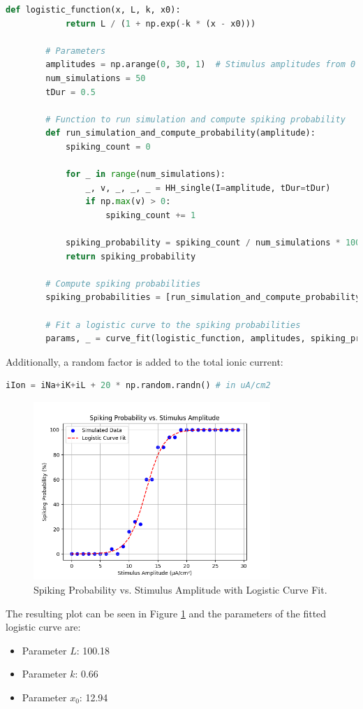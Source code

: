 \documentclass{article}
\begin{document}
    \begin{lstlisting}[language=Python, style=mystyle]
        def logistic_function(x, L, k, x0):
            return L / (1 + np.exp(-k * (x - x0)))

        # Parameters
        amplitudes = np.arange(0, 30, 1)  # Stimulus amplitudes from 0 to 30 μA/cm² in 1 μA/cm² steps
        num_simulations = 50
        tDur = 0.5

        # Function to run simulation and compute spiking probability
        def run_simulation_and_compute_probability(amplitude):
            spiking_count = 0

            for _ in range(num_simulations):
                _, v, _, _, _ = HH_single(I=amplitude, tDur=tDur)
                if np.max(v) > 0:
                    spiking_count += 1

            spiking_probability = spiking_count / num_simulations * 100
            return spiking_probability

        # Compute spiking probabilities
        spiking_probabilities = [run_simulation_and_compute_probability(amplitude) for amplitude in amplitudes]

        # Fit a logistic curve to the spiking probabilities
        params, _ = curve_fit(logistic_function, amplitudes, spiking_probabilities, p0=[100, 1, 15])
    \end{lstlisting}

    Additionally, a random factor is added to the total ionic current:
    \begin{lstlisting}[language=Python, style=mystyle]
        iIon = iNa+iK+iL + 20 * np.random.randn() # in uA/cm2
    \end{lstlisting}

    \begin{figure}[h]
        \centering
        \includegraphics[width=0.8\textwidth]{spiking_probability.png}
        \caption{Spiking Probability vs. Stimulus Amplitude with Logistic Curve Fit.}
        \label{fig:spiking_probability_plot}
    \end{figure}

    The resulting plot can be seen in Figure \ref{fig:spiking_probability_plot} and the parameters of the fitted logistic curve are:

    \begin{itemize}
        \item Parameter \(L\): 100.18
        \item Parameter \(k\): 0.66
        \item Parameter \(x_0\): 12.94
    \end{itemize}
\end{document}
